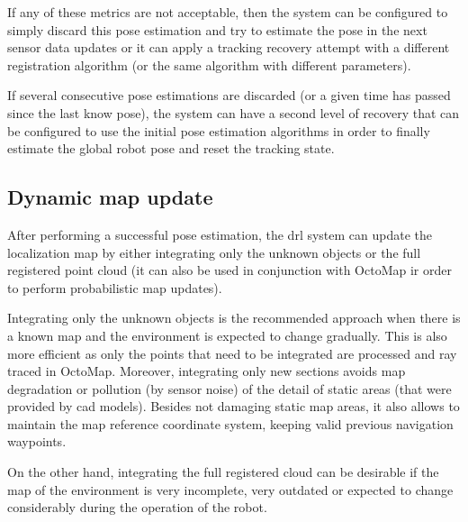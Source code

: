 If any of these metrics are not acceptable, then the system can be configured to simply discard this pose estimation and try to estimate the pose in the next sensor data updates or it can apply a tracking recovery attempt with a different registration algorithm (or the same algorithm with different parameters).

If several consecutive pose estimations are discarded (or a given time has passed since the last know pose), the system can have a second level of recovery that can be configured to use the initial pose estimation algorithms in order to finally estimate the global robot pose and reset the tracking state.


\subsection{Dynamic map update}

After performing a successful pose estimation, the \gls{drl} system can update the localization map by either integrating only the unknown objects or the full registered point cloud (it can also be used in conjunction with OctoMap \cite{Hornung2013} ir order to perform probabilistic map updates).

Integrating only the unknown objects is the recommended approach when there is a known map and the environment is expected to change gradually. This is also more efficient as only the points that need to be integrated are processed and ray traced in OctoMap. Moreover, integrating only new sections avoids map degradation or pollution (by sensor noise) of the detail of static areas (that were provided by \gls{cad} models). Besides not damaging static map areas, it also allows to maintain the map reference coordinate system, keeping valid previous navigation waypoints.

 On the other hand, integrating the full registered cloud can be desirable if the map of the environment is very incomplete, very outdated or expected to change considerably during the operation of the robot.
